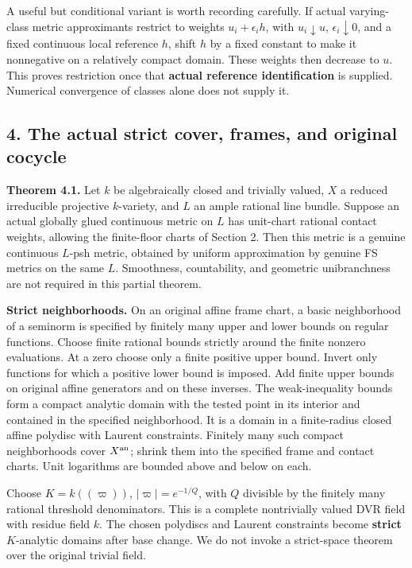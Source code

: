 \documentclass[
  10pt,
]{article}
\begin{document}
A useful but conditional variant is worth recording carefully. If actual
varying-class metric approximants restrict to weights
\(u_i+\epsilon_i h\), with \(u_i\downarrow u\),
\(\epsilon_i\downarrow0\), and a fixed continuous local reference \(h\),
shift \(h\) by a fixed constant to make it nonnegative on a relatively
compact domain. These weights then decrease to \(u\). This proves
restriction once that \textbf{actual reference identification} is
supplied. Numerical convergence of classes alone does not supply it.

\subsection{4. The actual strict cover, frames, and original
cocycle}\label{the-actual-strict-cover-frames-and-original-cocycle}

\textbf{Theorem 4.1.} Let \(k\) be algebraically closed and trivially
valued, \(X\) a reduced irreducible projective \(k\)-variety, and \(L\)
an ample rational line bundle. Suppose an actual globally glued
continuous metric on \(L\) has unit-chart rational contact weights,
allowing the finite-floor charts of Section 2. Then this metric is a
genuine continuous \(L\)-psh metric, obtained by uniform approximation
by genuine FS metrics on the same \(L\). Smoothness, countability, and
geometric unibranchness are not required in this partial theorem.

\textbf{Strict neighborhoods.} On an original affine frame chart, a
basic neighborhood of a seminorm is specified by finitely many upper and
lower bounds on regular functions. Choose finite rational bounds
strictly around the finite nonzero evaluations. At a zero choose only a
finite positive upper bound. Invert only functions for which a positive
lower bound is imposed. Add finite upper bounds on original affine
generators and on these inverses. The weak-inequality bounds form a
compact analytic domain with the tested point in its interior and
contained in the specified neighborhood. It is a domain in a
finite-radius closed affine polydisc with Laurent constraints. Finitely
many such compact neighborhoods cover \(X^{\rm an}\); shrink them into
the specified frame and contact charts. Unit logarithms are bounded
above and below on each.

Choose \(K=k((\varpi))\), \(|\varpi|=e^{-1/Q}\), with \(Q\) divisible by
the finitely many rational threshold denominators. This is a complete
nontrivially valued DVR field with residue field \(k\). The chosen
polydiscs and Laurent constraints become \textbf{strict} \(K\)-analytic
domains after base change. We do not invoke a strict-space theorem over
the original trivial field.
\end{document}
